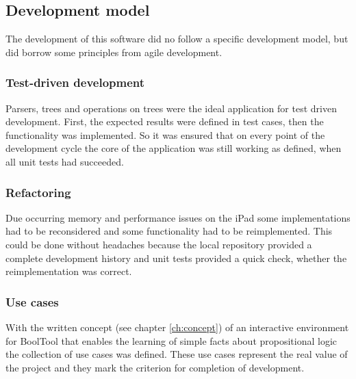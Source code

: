 \subsection{Development model}

The development of this software did no follow a specific development model, 
but did borrow some principles from agile development.

\subsubsection{Test-driven development}

Parsers, trees and operations on trees were the ideal application for test driven development.
First, the expected results were defined in test cases, then the functionality was implemented.
So it was ensured that on every point of the development cycle 
the core of the application was still working as defined,
when all unit tests had succeeded.


\subsubsection{Refactoring}

Due occurring memory and performance issues on the iPad
some implementations had to be reconsidered 
and some functionality had to be reimplemented.
This could be done without headaches because 
the local repository provided a complete development history 
and unit tests provided a quick check, whether the reimplementation was correct.


\subsubsection{Use cases}

With the written concept (see chapter \vref{ch:concept}) of an interactive environment for BoolTool 
that enables the learning  of simple facts about propositional logic the collection of use cases was defined. 
These use cases represent the real value of the project 
and they mark the criterion for completion of development.



